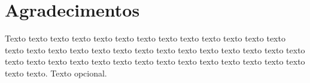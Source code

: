 \documentclass[11pt,twoside,a4paper]{book}
\begin{document}
%
%
%
%
%
%
%
%
%
%    
%      



\chapter*{Agradecimentos}
Texto texto texto texto texto texto texto texto texto texto texto texto texto
texto texto texto texto texto texto texto texto texto texto texto texto texto
texto texto texto texto texto texto texto texto texto texto texto texto texto
texto texto texto texto. Texto opcional.
\end{document}
